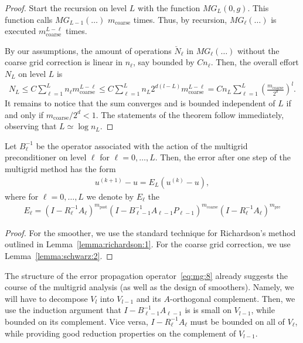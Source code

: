\begin{proof}
  Start the recursion on level $L$ with the function $MG_L(0,
  g)$. This function calls $MG_{L-1}(\ldots)$ $m_{\text{coarse}}$
  times. Thus, by recursion, $MG_{\ell}(\ldots)$ is executed
  $m_{\text{coarse}}^{L-\ell}$ times.
  
  By our assumptions, the amount of operations $\breve N_\ell$ in $MG_\ell(\ldots)$
  without the coarse grid correction is linear in $n_\ell$, say
  bounded by $Cn_\ell$. Then, the overall effort $N_L$ on level $L$ is
  \begin{gather}
    \label{eq:mg:6}
    N_L \le C \sum_{\ell=1}^L n_\ell m_{\text{coarse}}^{L-\ell} \le C
    \sum_{\ell=1}^L n_L 2^{d(l-L)}m_{\text{coarse}}^{L-\ell}
    = C n_L \sum_{\ell=1}^L \left(\frac{m_{\text{coarse}}}{2^d}\right)^l.
  \end{gather}
  It remains to notice that the sum converges and is bounded
  independent of $L$ if and only if $m_{\text{coarse}}/2^d < 1$. The
  statements of the theorem follow immediately, observing that $L
  \simeq \log n_L$.
\end{proof}

\begin{lemma}
  Let $B_\ell^{-1}$ be the operator associated with the action of the
  multigrid preconditioner on level $\ell$ for
  $\ell=0,\ldots,L$. Then, the error after one step of the multigrid
  method has the form
  \begin{gather}
    \label{eq:mg:7}
    u^{(k+1)} - u = E_L \left(u^{(k)} - u \right),
  \end{gather}
  where for $\ell=0,\ldots,L$ we denote by $E_\ell$ the
  \begin{gather}
    \label{eq:mg:8}
    E_\ell = \left(I-R_\ell^{-1} A_\ell\right)^{m_{\text{post}}}
    \left(I-B_{\ell-1}^{-1}A_{\ell-1} P_{\ell-1}\right)^{m_{\text{coarse}}}
     \left(I-R_\ell^{-1} A_\ell\right)^{m_{\text{pre}}}
  \end{gather}
\end{lemma}

\begin{proof}
  For the smoother, we use the standard technique for Richardson's
  method outlined in Lemma~\ref{lemma:richardson:1}. For the coarse
  grid correction, we use Lemma~\ref{lemma:schwarz:2}.
\end{proof}

\begin{note}
  The structure of the error propagation operator~\eqref{eq:mg:8}
  already suggests the course of the multigrid analysis (as well as
  the design of smoothers). Namely, we will have to decompose $V_l$
  into $V_{l-1}$ and its $A$-orthogonal complement. Then, we use the
  induction argument that $I-B_{\ell-1}^{-1}A_{\ell-1}$ is is small on
  $V_{l-1}$, while bounded on its complement. Vice versa,
  $I-R_\ell^{-1} A_\ell$ must be bounded on all of $V_\ell$, while
  providing good reduction properties on the complement of $V_{l-1}$.
\end{note}

